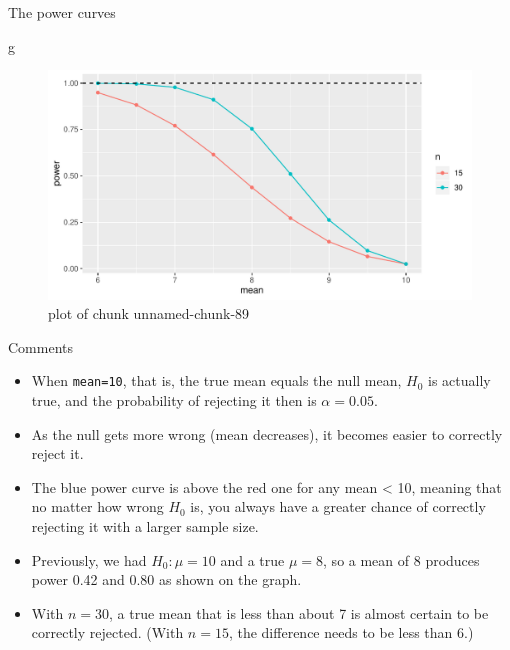 \documentclass[ignorenonframetext,]{beamer}
\newenvironment{Shaded}{\begin{snugshade}}{\end{snugshade}}
\newcommand{\NormalTok}[1]{#1}
\providecommand{\tightlist}{%
  \setlength{\itemsep}{0pt}\setlength{\parskip}{0pt}}
\begin{document}
\begin{frame}[fragile]{The power curves}
\protect\hypertarget{the-power-curves}{}

\begin{Shaded}
\begin{Highlighting}[]
\NormalTok{g}
\end{Highlighting}
\end{Shaded}

\begin{figure}
\centering
\includegraphics{figure/unnamed-chunk-89-1.pdf}
\caption{plot of chunk unnamed-chunk-89}
\end{figure}

\end{frame}

\begin{frame}[fragile]{Comments}
\protect\hypertarget{comments-3}{}

\begin{itemize}
\tightlist
\item
  When \texttt{mean=10}, that is, the true mean equals the null mean,
  \(H_0\) is actually true, and the probability of rejecting it then is
  \(\alpha = 0.05\).
\item
  As the null gets more wrong (mean decreases), it becomes easier to
  correctly reject it.
\item
  The blue power curve is above the red one for any mean \textless{} 10,
  meaning that no matter how wrong \(H_0\) is, you always have a greater
  chance of correctly rejecting it with a larger sample size.
\item
  Previously, we had \(H_0 : \mu = 10\) and a true \(\mu = 8\), so a
  mean of 8 produces power 0.42 and 0.80 as shown on the graph.
\item
  With \(n = 30\), a true mean that is less than about 7 is almost
  certain to be correctly rejected. (With \(n = 15\), the difference
  needs to be less than 6.)
\end{itemize}

\end{frame}
\end{document}
